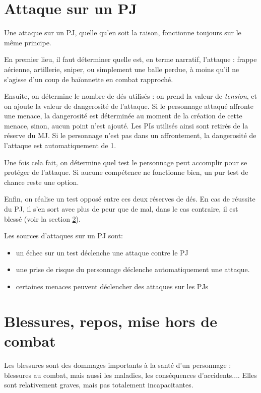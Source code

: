\documentclass{report}
\begin{document}
\begin{multicols}{2}
\section{Attaque sur un PJ}
\label{attaque}
Une attaque sur un PJ, quelle qu'en soit la raison, fonctionne toujours sur le même principe.

En premier lieu, il faut déterminer quelle est, en terme narratif, l'attaque : frappe aérienne, artillerie, sniper, ou simplement une balle perdue, à moins qu'il ne s'agisse d'un coup de baïonnette en combat rapproché.

Ensuite, on détermine le nombre de dés utilisés : on prend la valeur de \emph{tension}, et on ajoute la valeur de dangerosité de l'attaque. Si le personnage attaqué affronte une menace, la dangerosité est déterminée au moment de la création de cette menace, sinon, aucun point n'est ajouté. Les PIs utilisés ainsi sont retirés de la réserve du MJ. Si le personnage n'est pas dans un affrontement, la dangerosité de l'attaque est automatiquement de 1.

Une fois cela fait, on détermine quel test le personnage peut accomplir pour se protéger de l'attaque. Si aucune compétence ne fonctionne bien, un pur test de chance reste une option. 

Enfin, on réalise un test opposé entre ces deux réserves de dés. En cas de réussite du PJ, il s'en sort avec plus de peur que de mal, dans le cas contraire, il est blessé (voir la section \ref{blessure}).

Les sources d'attaques sur un PJ sont:
\begin{itemize}
    \item un échec sur un test déclenche une attaque contre le PJ
    \item une prise de risque du personnage déclenche automatiquement une attaque.
    \item certaines menaces peuvent déclencher des attaques sur les PJs
\end{itemize}

\section{Blessures, repos, mise hors de combat}
\label{blessure}
Les blessures sont des dommages importants à la santé d'un personnage : blessures au combat, mais aussi les maladies, les conséquences d'accidents.... Elles sont relativement graves, mais pas totalement incapacitantes.


\end{multicols}
\end{document}
